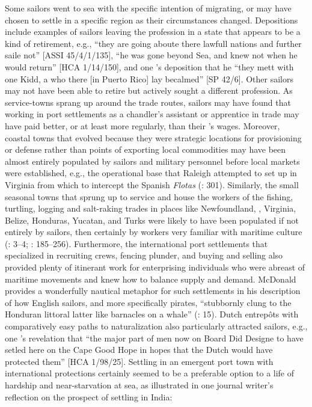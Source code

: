 Some sailors went to sea with the specific intention of migrating, or may have chosen to settle in a specific region as their circumstances changed.  Depositions include examples of sailors leaving the profession in a state that appears to be a kind of retirement, e.g., “they are going aboute there lawfull nations and further saile not” [ASSI 45/4/1/135], “he was gone beyond Sea, and knew not when he would return” [HCA 1/14/150], and one ’s deposition that he “they mett with one Kidd, a  who there [in Puerto Rico] lay becalmed” [SP 42/6]. Other sailors may not have been able to retire but actively sought a different profession. As service-towns sprang up around the trade routes, sailors may have found that working in port settlements as a chandler’s assistant or apprentice in trade may have paid better, or at least more regularly, than their ’s wages. Moreover, coastal towns that evolved because they were strategic locations for provisioning or defense rather than points of exporting local commodities may have been almost entirely populated by sailors and military personnel before local markets were established, e.g., the operational base that Raleigh attempted to set up in Virginia from which to intercept the Spanish \textit{Flotas} (\citealt{Bicheno2012}: 301). Similarly, the small seasonal towns that sprung up to service and house the workers of the fishing, turtling, logging and salt-raking trades in places like Newfoundland, , Virginia, Belize, Honduras, Yucatan, and Turks were likely to have been populated if not entirely by sailors, then certainly by workers very familiar with maritime culture (\citealt{Draper2016}: 3--4; \citealt{Jarvis2010}: 185--256). Furthermore, the international port settlements that specialized in recruiting crews, fencing plunder, and buying and selling  also provided plenty of itinerant work for enterprising individuals who were abreast of maritime movements and knew how to balance supply and demand. McDonald provides a wonderfully nautical metaphor for such settlements in his description of how English sailors, and more specifically pirates, “stubbornly clung to the Honduran littoral latter like barnacles on a whale” (\citealt{McDonald2016}: 15). Dutch entrepôts with comparatively easy paths to naturalization also particularly attracted sailors, e.g., one ’s revelation that “the major part of men now on Board Did Designe to have setled here on the Cape Good Hope in hopes that the Dutch would have protected them” [HCA 1/98/25]. Settling in an emergent port town with international protections certainly seemed to be a preferable option to a life of hardship and near-starvation at sea, as illustrated in one journal writer’s reflection on the prospect of settling in India:

